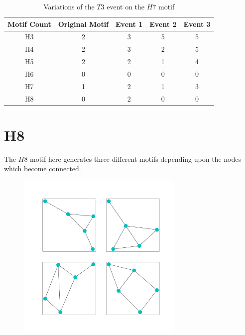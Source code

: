 \begin{table}
    \centering
    \begin{tabular}{||c c c c c||} 
    \hline
    Motif Count & Original Motif & Event 1 & Event 2 & Event 3 \\ [0.5ex] 
    \hline\hline
    H3 & 2 & 3 & 5 & 5\\ 
    \hline
    H4 & 2 & 3 & 2 & 5 \\
    \hline
    H5 & 2 & 2 & 1 & 4 \\
    \hline
    H6 & 0 & 0 & 0 & 0 \\
    \hline
    H7 & 1 & 2 & 1 & 3 \\
    \hline
    H8 & 0 & 2 & 0 & 0\\
    \hline
   \end{tabular}
   \caption{Variations of the $T3$ event on the $H7$ motif}
   \label{table:16}
\end{table}

\section{H8}
The $H8$ motif here generates three different motifs depending upon the nodes which become connected.
\begin{figure}[!ht]
    \includegraphics[width=8cm]{Images/H8_T3_evolution.png}
    \centering
\end{figure}

